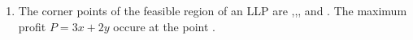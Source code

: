 
\begin{enumerate}
	\item The corner points of the feasible region of an LLP are ,,, and . The maximum profit $P=3x+2y$ occure at the point \underline{\hspace{4cm}}.
\end{enumerate}
